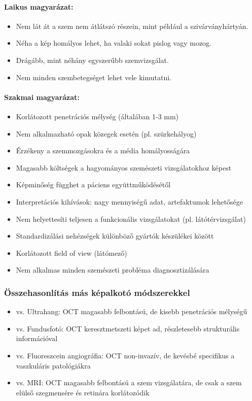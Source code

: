\documentclass[a4paper,12pt]{article}
\begin{document}
\paragraph{Laikus magyarázat:} \begin{itemize} \item Nem lát át a szem nem átlátszó részein, mint például a szivárványhártyán. \item Néha a kép homályos lehet, ha valaki sokat pislog vagy mozog. \item Drágább, mint néhány egyszerűbb szemvizsgálat. \item Nem minden szembetegséget lehet vele kimutatni. \end{itemize}

\paragraph{Szakmai magyarázat:} \begin{itemize} \item Korlátozott penetrációs mélység (általában 1-3 mm) \item Nem alkalmazható opak közegek esetén (pl. szürkehályog) \item Érzékeny a szemmozgásokra és a média homályosságára \item Magasabb költségek a hagyományos szemészeti vizsgálatokhoz képest \item Képminőség függhet a páciens együttműködésétől \item Interpretációs kihívások: nagy mennyiségű adat, artefaktumok lehetősége \item Nem helyettesíti teljesen a funkcionális vizsgálatokat (pl. látótérvizsgálat) \item Standardizálási nehézségek különböző gyártók készülékei között \item Korlátozott field of view (látómező) \item Nem alkalmas minden szemészeti probléma diagnosztizálására \end{itemize}

\subsubsection{Összehasonlítás más képalkotó módszerekkel}

\begin{itemize} \item vs. Ultrahang: OCT magasabb felbontású, de kisebb penetrációs mélységű \item vs. Fundusfotó: OCT keresztmetszeti képet ad, részletesebb strukturális információval \item vs. Fluoreszcein angiográfia: OCT non-invazív, de kevésbé specifikus a vaszkuláris patológiákra \item vs. MRI: OCT magasabb felbontású a szem vizsgálatára, de csak a szem elülső szegmensére és retinára korlátozódik \end{itemize}
\end{document}
